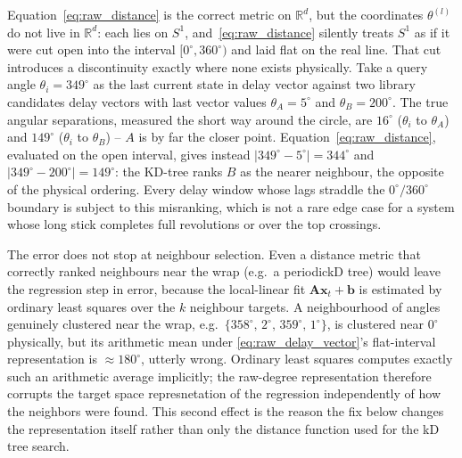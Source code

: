 \documentclass[letterpaper, 10pt, conference]{IEEEtran}
\begin{document}
        Equation~\eqref{eq:raw_distance} is the correct metric on
        $\mathbb{R}^d$, but the coordinates $\theta^{(l)}$ do not live in
        $\mathbb{R}^d$: each lies on $S^1$, and~\eqref{eq:raw_distance}
        silently treats $S^1$ as if it were cut open into the interval
        $[0^{\circ},360^{\circ})$ and laid flat on the real line. That cut
        introduces a discontinuity exactly where none exists physically. Take
        a query angle $\theta_i = 349^{\circ}$ as the last current state in  delay vector against two library candidates delay vectors with last vector values
        $\theta_A = 5^{\circ}$ and $\theta_B = 200^{\circ}$. The true angular
        separations, measured the short way around the circle, are
        $16^{\circ}$ ($\theta_i$ to $\theta_A$) and $149^{\circ}$ ($\theta_i$
        to $\theta_B$) -- $A$ is by far the closer point. Equation~\eqref{eq:raw_distance},
        evaluated on the open interval, gives instead
        $|349^{\circ}-5^{\circ}| = 344^{\circ}$ and
        $|349^{\circ}-200^{\circ}| = 149^{\circ}$: the KD-tree ranks $B$ as
        the nearer neighbour, the opposite of the physical ordering. Every
        delay window whose lags straddle the $0^{\circ}/360^{\circ}$ boundary
        is subject to this misranking, which is not a rare edge case for a
        system whose long stick completes full revolutions or over the top crossings.

        The error does not stop at neighbour selection. Even a distance
        metric that correctly ranked neighbours near the wrap (e.g.\ a
        periodickD tree) would leave the regression step in
        error, because the local-linear fit $\mathbf{A}\mathbf{x}_t+\mathbf{b}$
        is estimated by ordinary least squares over the $k$ neighbour
        targets. A neighbourhood of angles genuinely clustered near the wrap,
        e.g.\ $\{358^{\circ},\,2^{\circ},\,359^{\circ},\,1^{\circ}\}$, is
        clustered near $0^{\circ}$ physically, but its arithmetic mean under
        \eqref{eq:raw_delay_vector}'s flat-interval representation is
        $\approx180^{\circ}$, utterly wrong. Ordinary least squares
        computes exactly such an arithmetic average implicitly; the raw-degree
        representation therefore corrupts the target space represnetation of the regression
        independently of how the neighbors were found. This second effect is
        the reason the fix below changes the representation itself rather
        than only the distance function used for the kD tree search. \\
\end{document}
